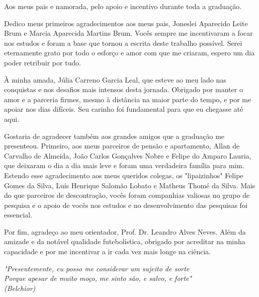 \documentclass[
  12pt,		
  a4paper,	
  openright,  
  oneside,	
  chapter=TITLE,		
  section=TITLE,		
  english,	
  french,	    
  spanish,	
  brazil	    
]{abntex2}
\begin{document}
    \begin{dedicatoria}
        \vspace*{\fill}
        \begin{flushright}
            Aos meus pais e namorada, pelo apoio e incentivo durante toda a graduação.\\ %
        \end{flushright}
        \vspace*{1cm}
    \end{dedicatoria}

    \begin{agradecimentos}
    Dedico meus primeiros agradecimentos aos meus pais, Joneslei Aparecido Leite Brum e Marcia Aparecida Martins Brum. Vocês sempre me incentivaram a focar nos estudos e foram a base que tornou a escrita deste trabalho possível. Serei eternamente grato por todo o esforço e amor com que me criaram, espero um dia poder retribuir por tudo.

    À minha amada, Júlia Carreno Garcia Leal, que esteve ao meu lado nas conquistas e nos desafios mais intensos desta jornada. Obrigado por manter o amor e a parceria firmes, mesmo à distância na maior parte do tempo, e por me apoiar nos dias difíceis. Seu carinho foi fundamental para que eu chegasse até aqui.
	
    Gostaria de agradecer também aos grandes amigos que a graduação me presenteou. Primeiro, aos meus parceiros de pensão e apartamento, Allan de Carvalho de Almeida, João Carlos Gonçalves Nobre e Felipe do Amparo Lauria, que deixaram o dia a dia mais leve e foram uma verdadeira família para mim. Estendo esse agradecimento aos meus queridos colegas, os "lipaizinhos" Felipe Gomes da Silva, Luís Henrique Salomão Lobato e Matheus Thomé da Silva. Mais do que parceiros de descontração, vocês foram companhias valiosas no grupo de pesquisa e o apoio de vocês nos estudos e no desenvolvimento das pesquisas foi essencial.

    Por fim, agradeço ao meu orientador, Prof. Dr. Leandro Alves Neves. Além da amizade e da notável qualidade futebolística, obrigado por acreditar na minha capacidade e por me incentivar a ir cada vez mais longe na ciência.
     \end{agradecimentos}
    
    \begin{epigrafe}
        \vspace*{\fill}
    	\begin{flushright}
    		\textit{
        		"Presentemente, eu posso me considerar um sujeito de sorte\\
                Porque apesar de muito moço, me sinto são, e salvo, e forte"\\
                (Belchior)
            }
    	\end{flushright}
    \end{epigrafe}
    
\end{document}
